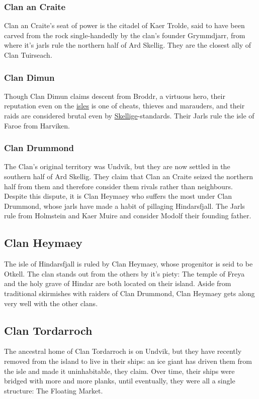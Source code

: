 \documentclass[parskip=full,11pt,%
footheight=38pt]{scrreport}
\begin{document}
\subsubsection{Clan an Craite}
Clan an Craite's seat of power is the citadel of Kaer Trolde, said to have been carved from the rock single-handedly by the clan's founder Grymmdjarr,
from where it's jarls rule the northern half of Ard Skellig. They are the closest ally of Clan Tuirseach.

\subsubsection{Clan Dimun}
Though Clan Dimun claims descent from Broddr, a virtuous hero, their reputation even on the \hyperref[region:skellige]{isles} is one of cheats, thieves
and marauders, and their raids are considered brutal even by \hyperref[region:skellige]{Skellige}-standards. Their Jarls rule the isle of Faroe from Harviken.

\subsubsection{Clan Drummond}
The Clan's original territory was Undvik, but they are now settled in the southern half of Ard Skellig. They claim that Clan an Craite seized the northern half
from them and therefore consider them rivals rather than neighbours. Despite this dispute, it is Clan Heymaey who suffers the most under Clan Drummond, whose
jarls have made a habit of pillaging Hindarsfjall. The Jarls rule from Holmstein and Kaer Muire and consider Modolf their founding father.

\subsection{Clan Heymaey}
The isle of Hindarsfjall is ruled by Clan Heymaey, whose progenitor is seid to be Otkell. The clan stands out from the others by it's piety: The temple of Freya
and the holy grave of Hindar are both located on their island. Aside from traditional skirmishes with raiders of Clan Drummond, Clan Heymaey gets along
very well with the other clans.

\subsection{Clan Tordarroch}
The ancestral home of Clan Tordarroch is on Undvik, but they have recently removed from the island to live in their ships: an ice giant has driven them from
the isle and made it uninhabitable, they claim. Over time, their ships were bridged with more and more planks, until eventually, they were all a single structure:
The Floating Market.
\end{document}
